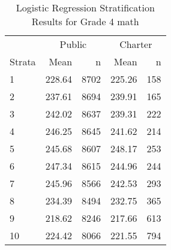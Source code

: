 \begin{table}[ht]
\centering
\caption{Logistic Regression Stratification Results for Grade 4 math} 
\label{g4math-circpsa10}
\begin{tabular}{lrr@{\extracolsep{.2cm}}rr}
  \hline
   & \multicolumn{2}{c}{Public} & \multicolumn{2}{c}{Charter} \\ \cline{2-3} \cline{4-5} Strata & Mean & n & Mean & n \\ \hline
1 & 228.64 & 8702 & 225.26 & 158 \\ 
  2 & 237.61 & 8694 & 239.91 & 165 \\ 
  3 & 242.02 & 8637 & 239.31 & 222 \\ 
  4 & 246.25 & 8645 & 241.62 & 214 \\ 
  5 & 245.68 & 8607 & 248.17 & 253 \\ 
  6 & 247.34 & 8615 & 244.96 & 244 \\ 
  7 & 245.96 & 8566 & 242.53 & 293 \\ 
  8 & 234.39 & 8494 & 232.75 & 365 \\ 
  9 & 218.62 & 8246 & 217.66 & 613 \\ 
  10 & 224.42 & 8066 & 221.55 & 794 \\ 
   \hline
\end{tabular}
\end{table}
